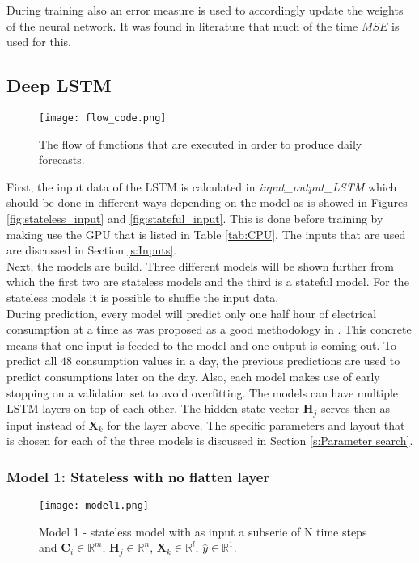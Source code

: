 During training also an error measure is used to accordingly update the weights of the neural network. It was found in literature that much of the time $ MSE $ is used for this.


\subsection{Deep LSTM}\label{s:LSTM_implementation}
\begin{figure}[ht]
	\centering
	\texttt{[image: flow\_code.png]}
	\caption{The flow of functions that are executed in order to produce daily forecasts.}
	\label{fig:model1}
\end{figure}


First, the input data of the LSTM is calculated in \textit{input\_output\_LSTM} which should be done in different ways depending on the model as is showed in Figures \ref{fig:stateless_input} and \ref{fig:stateful_input}. This is done before training by making use the GPU that is listed in Table \ref{tab:CPU}. The inputs that are used are discussed in Section \ref{s:Inputs}. \\ 
Next, the models are build. Three different models will be shown further from which the first two are stateless models and the third is a stateful model. For the stateless models it is possible to shuffle the input data. \\
During prediction, every model will predict only one half hour of electrical consumption at a time as was proposed as a good methodology in \cite{ANNRNN}. This concrete means that one input is feeded to the model and one output is coming out. To predict all $ 48 $ consumption values in a day, the previous predictions are used to predict consumptions later on the day. Also, each model makes use of early stopping on a validation set to avoid overfitting. The models can have multiple LSTM layers on top of each other. The hidden state vector $ \bm{H}_{j} $ serves then as input instead of $ \bm{X}_{k} $ for the layer above. The specific parameters and layout that is chosen for each of the three models is discussed in Section \ref{s:Parameter search}.

\subsubsection{Model 1: Stateless with no flatten layer}\label{s:Model1}

\begin{figure}[h]
	\centering
	\texttt{[image: model1.png]}
	\caption{Model 1 - stateless model with as input a subserie of N time steps and $ \bm{C}_{i} \in \mathbb{R}^{m} $, $ \bm{H}_{j} \in \mathbb{R}^{n} $, $ \bm{X}_{k} \in \mathbb{R}^{l} $, $ \hat{y} \in \mathbb{R}^{1} $.}
	\label{fig:model1}
\end{figure}

